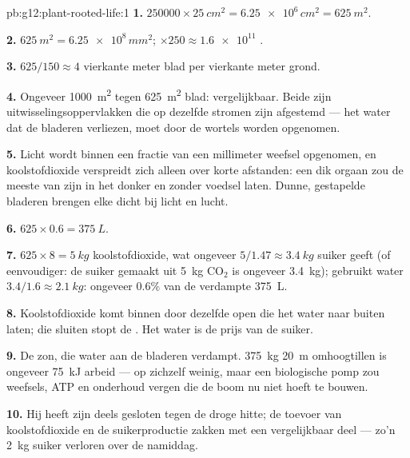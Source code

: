 \begin{solution}{pb:g12:plant-rooted-life:1}
\textbf{1.} $\num{250000} \times \qty{25}{cm^2} = \num{6.25e6}\,
\unit{cm^2} = \qty{625}{m^2}$.

\textbf{2.} $\qty{625}{m^2} = \num{6.25e8}\,\unit{mm^2}$; $\times 250
\approx \num{1.6e11}$ .

\textbf{3.} $625/150 \approx 4$ vierkante meter blad per vierkante meter
grond.

\textbf{4.} Ongeveer \qty{1000}{m^2}  tegen \qty{625}{m^2}
blad: vergelijkbaar. Beide zijn uitwisselingsoppervlakken die op dezelfde
stromen zijn afgestemd --- het water dat de bladeren verliezen, moet door
de wortels worden opgenomen.

\textbf{5.} Licht wordt binnen een fractie van een millimeter weefsel
opgenomen, en koolstofdioxide verspreidt zich alleen over korte
afstanden: een dik orgaan zou de meeste van zijn  in het donker en
zonder voedsel laten. Dunne, gestapelde bladeren brengen elke  dicht
bij licht en lucht.

\textbf{6.} $625 \times 0.6 = \qty{375}{L}$.

\textbf{7.} $625 \times 8 = \qty{5}{kg}$ koolstofdioxide, wat ongeveer
$5/1.47 \approx \qty{3.4}{kg}$ suiker geeft (of eenvoudiger: de suiker
gemaakt uit \qty{5}{kg} $\mathrm{CO_2}$ is ongeveer \qty{3.4}{kg});
gebruikt water $3.4/1.6 \approx \qty{2.1}{kg}$: ongeveer 0.6\% van de
verdampte \qty{375}{L}.

\textbf{8.} Koolstofdioxide komt binnen door dezelfde open 
die het water naar buiten laten; die sluiten stopt de . Het
water is de prijs van de suiker.

\textbf{9.} De zon, die water aan de bladeren verdampt. \qty{375}{kg}
\qty{20}{m} omhoogtillen is ongeveer \qty{75}{kJ} arbeid --- op zichzelf
weinig, maar een biologische pomp zou weefsels, ATP en onderhoud vergen
die de boom nu niet hoeft te bouwen.

\textbf{10.} Hij heeft zijn  deels gesloten tegen de droge
hitte; de toevoer van koolstofdioxide en de suikerproductie zakken met een
vergelijkbaar deel --- zo'n \qty{2}{kg} suiker verloren over de namiddag.


\end{solution}
